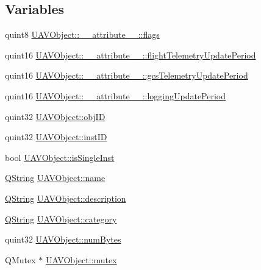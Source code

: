 \subsection*{Variables}
\begin{DoxyCompactItemize}
\item 
quint8 \hyperlink{group___u_a_v_objects_plugin_gaf5421bbd1e8748b9f0f12ba5b6722bdd}{U\-A\-V\-Object\-::\-\_\-\-\_\-attribute\-\_\-\-\_\-\-::flags}
\item 
quint16 \hyperlink{group___u_a_v_objects_plugin_gaa29a38fd35ce73e9e4afd2698de44797}{U\-A\-V\-Object\-::\-\_\-\-\_\-attribute\-\_\-\-\_\-\-::flight\-Telemetry\-Update\-Period}
\item 
quint16 \hyperlink{group___u_a_v_objects_plugin_ga3698244bb0c29537b3d26442624ee03b}{U\-A\-V\-Object\-::\-\_\-\-\_\-attribute\-\_\-\-\_\-\-::gcs\-Telemetry\-Update\-Period}
\item 
quint16 \hyperlink{group___u_a_v_objects_plugin_gad4c54f8af5beeb9dc2bbe402c9f01299}{U\-A\-V\-Object\-::\-\_\-\-\_\-attribute\-\_\-\-\_\-\-::logging\-Update\-Period}
\item 
quint32 \hyperlink{group___u_a_v_objects_plugin_gafc50acdaa311c9fd9aaddf90fd578c14}{U\-A\-V\-Object\-::obj\-I\-D}
\item 
quint32 \hyperlink{group___u_a_v_objects_plugin_gad8d656542a04e9fbef607ff178f6d9d3}{U\-A\-V\-Object\-::inst\-I\-D}
\item 
bool \hyperlink{group___u_a_v_objects_plugin_gaa279cad3a000cc930e7f386672426bcb}{U\-A\-V\-Object\-::is\-Single\-Inst}
\item 
\hyperlink{group___u_a_v_objects_plugin_gab9d252f49c333c94a72f97ce3105a32d}{Q\-String} \hyperlink{group___u_a_v_objects_plugin_gadf898ed0961464f4a3f8e05fb28019f5}{U\-A\-V\-Object\-::name}
\item 
\hyperlink{group___u_a_v_objects_plugin_gab9d252f49c333c94a72f97ce3105a32d}{Q\-String} \hyperlink{group___u_a_v_objects_plugin_gaeeb0e865791ad6b21d83ef571d1ce48b}{U\-A\-V\-Object\-::description}
\item 
\hyperlink{group___u_a_v_objects_plugin_gab9d252f49c333c94a72f97ce3105a32d}{Q\-String} \hyperlink{group___u_a_v_objects_plugin_gae96da3f59e51fb5c3ca43056bda4a63e}{U\-A\-V\-Object\-::category}
\item 
quint32 \hyperlink{group___u_a_v_objects_plugin_ga260cfb19e663f64d51ba1258e760a207}{U\-A\-V\-Object\-::num\-Bytes}
\item 
Q\-Mutex $\ast$ \hyperlink{group___u_a_v_objects_plugin_gacf8a1ff5bac6d34fc1d7192a86194361}{U\-A\-V\-Object\-::mutex}

\end{DoxyCompactItemize}
